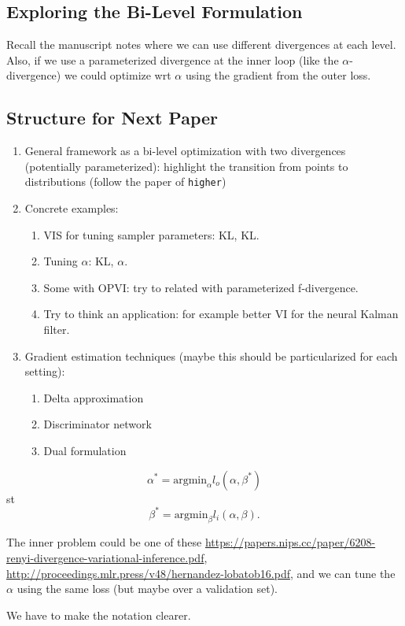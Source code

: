 \subsection{Exploring the Bi-Level Formulation}

Recall the manuscript notes where we can use different divergences at each level.
Also, if we use a parameterized divergence at the inner loop (like the $\alpha$-divergence) we could optimize wrt $\alpha$ using the gradient from the outer loss.

\subsection{Structure for Next Paper}

\begin{enumerate}
    \item General framework as a bi-level optimization with two divergences (potentially parameterized): highlight the transition from points to distributions (follow the paper of \texttt{higher})
    \item Concrete examples:
    \begin{enumerate}
        \item VIS for tuning sampler parameters: KL, KL.
        \item Tuning $\alpha$: KL, $\alpha$.
        \item Some with OPVI: try to related with parameterized f-divergence.
        \item Try to think an application: for example better VI for the neural Kalman filter.
    \end{enumerate}
    \item Gradient estimation techniques (maybe this should be particularized for each setting):
    \begin{enumerate}
        \item Delta approximation
        \item Discriminator network
        \item Dual formulation
    \end{enumerate}
\end{enumerate}


$$
\alpha^* = \mbox{argmin}_{\alpha} l_o(\alpha, \beta^*)
$$
st
$$
\beta^* = \mbox{argmin}_{\beta} l_i(\alpha, \beta).
$$

The inner problem could be one of these \url{https://papers.nips.cc/paper/6208-renyi-divergence-variational-inference.pdf}, \url{http://proceedings.mlr.press/v48/hernandez-lobatob16.pdf}, and we can tune the $\alpha$ using the same loss (but maybe over a validation set).

We have to make the notation clearer.
\fi